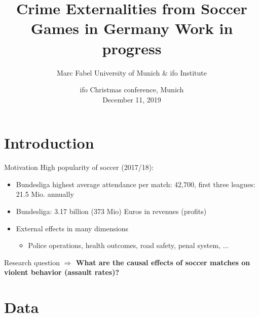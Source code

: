 \documentclass[usenames,dvipsnames]{beamer} %
\title[Soccer and Crime]{  \textbf{Crime Externalities from Soccer Games in Germany }\newline Work in progress}
\author[Marc Fabel]{Marc Fabel \newline University of Munich \& ifo Institute}
\date{ifo Christmas conference, Munich\\December 11, 2019}
\begin{document}
\begin{frame}
	\titlepage
\end{frame}




\section{Introduction}
	\begin{frame}{Motivation}
		High popularity of soccer (2017/18):
		\begin{itemize}
			\item Bundesliga highest average attendance per match: 42,700, first three leagues: 21.5 Mio. annually
			\item Bundesliga: 3.17 billion (373 Mio) Euros in revenues (profits)
			\item External effects in many dimensions
			\begin{itemize}
				\item Police operations, health outcomes, road safety, penal system, ...
			\end{itemize}						
		\end{itemize}


		\begin{block}{Research question}
			\textbf{$\Rightarrow$ What are the causal effects of soccer matches on violent behavior (assault rates)?}
		\end{block}
	\end{frame}
%	
%	




\section{Data}
\end{document}
